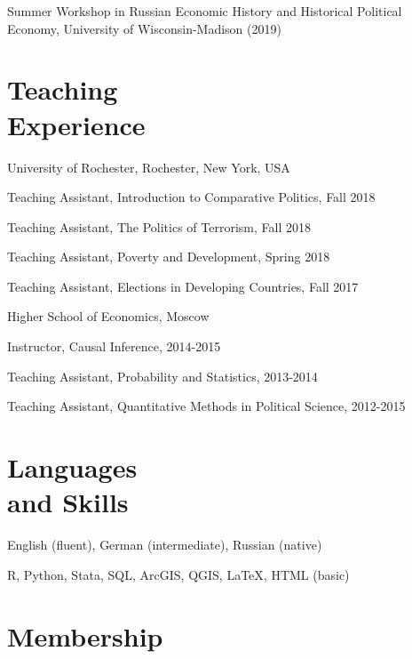 \documentclass[margin,line,12pt]{res}
\newenvironment{list1}{
  \begin{list}{\ding{113}}{%
      \setlength{\itemsep}{0in}
      \setlength{\parsep}{0in} \setlength{\parskip}{0in}
      \setlength{\topsep}{0in} \setlength{\partopsep}{0in}
      \setlength{\leftmargin}{0.17in}}}{\end{list}}
\begin{document}
\begin{resume}
 \vspace*{-4.5mm} 
 Summer Workshop in Russian Economic History and Historical Political Economy, University of Wisconsin-Madison (2019)
 

\section{\sc Teaching \\ Experience}

{University of Rochester}, Rochester, New York, USA\\
\vspace*{-.1in}
\begin{list1}
\item[] Teaching Assistant, Introduction to Comparative Politics, Fall 2018
\item[] Teaching Assistant, The Politics of Terrorism, Fall 2018
\item[] Teaching Assistant, Poverty and Development, Spring 2018
\item[] Teaching Assistant, Elections in Developing Countries, Fall 2017 
\end{list1}

\vspace{-3mm}
{Higher School of Economics, Moscow}\\
\vspace*{-.1in}
\begin{list1}
	\item[] Instructor, Causal Inference, 2014-2015
	\item[] Teaching Assistant, Probability and Statistics, 2013-2014
	\item[] Teaching Assistant, Quantitative Methods in Political Science, 2012-2015
\end{list1}

\section{\sc Languages \\ and Skills}
English (fluent), German (intermediate), Russian (native)
\vspace*{-4.5mm}

R, Python, Stata, SQL, ArcGIS, QGIS, \LaTeX , HTML (basic) 
\vspace*{-2.5mm}

\section{\sc Membership}


\end{resume}
\end{document}
